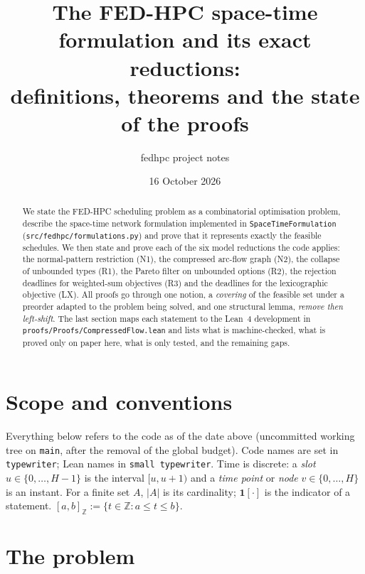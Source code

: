 \documentclass[11pt,a4paper]{article}
\title{The FED-HPC space-time formulation and its exact reductions:\\
definitions, theorems and the state of the proofs}
\author{fedhpc project notes}
\date{16 October 2026}
\newcommand{\Z}{\mathbb{Z}}
\newcommand{\code}[1]{\texttt{#1}}
\newcommand{\lean}[1]{\texttt{\small #1}}
\newcommand{\ind}[1]{\mathbf{1}[#1]}
\begin{document}
\maketitle

\begin{abstract}
We state the FED-HPC scheduling problem as a combinatorial optimisation
problem, describe the space-time network formulation implemented in
\code{SpaceTimeFormulation} (\code{src/fedhpc/formulations.py}) and prove that
it represents exactly the feasible schedules. We then state and prove each of
the six model reductions the code applies: the normal-pattern restriction
(N1), the compressed arc-flow graph (N2), the collapse of unbounded types
(R1), the Pareto filter on unbounded options (R2), the rejection deadlines for
weighted-sum objectives (R3) and the deadlines for the lexicographic objective
(LX). All proofs go through one notion, a \emph{covering} of the feasible set
under a preorder adapted to the problem being solved, and one structural
lemma, \emph{remove then left-shift}. The last section maps each statement to
the Lean~4 development in \code{proofs/Proofs/CompressedFlow.lean} and lists
what is machine-checked, what is proved only on paper here, what is only
tested, and the remaining gaps.
\end{abstract}

\tableofcontents

\section{Scope and conventions}

Everything below refers to the code as of the date above (uncommitted working
tree on \code{main}, after the removal of the global budget). Code names are
set in \code{typewriter}; Lean names in \lean{small typewriter}. Time is
discrete: a \emph{slot} $u\in\{0,\dots,H-1\}$ is the interval $[u,u+1)$ and a
\emph{time point} or \emph{node} $v\in\{0,\dots,H\}$ is an instant. For a
finite set $A$, $|A|$ is its cardinality; $\ind{\cdot}$ is the indicator of a
statement. $[a,b]_\Z := \{t\in\Z : a\le t\le b\}$.

\section{The problem}\label{sec:problem}
\end{document}
